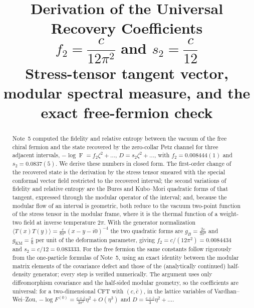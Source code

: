 \documentclass[11pt]{article}
\title{\vspace{-1.55cm}\color{navy}\bfseries
Derivation of the Universal Recovery Coefficients\\[0.35em]
\Large \(f_2=\dfrac{c}{12\pi^2}\) and \(s_2=\dfrac{c}{12}\)\\[0.5em]
\large Stress-tensor tangent vector, modular spectral measure, and the exact free-fermion check}
\author{}
\date{}
\theoremstyle{accent}
\theoremstyle{definition}
\newcommand{\Fid}{\operatorname{F}}
\begin{document}
\maketitle
\vspace{-1.55em}

\begin{abstract}
Note~5 computed the fidelity and relative entropy between the vacuum of the free chiral fermion and the state recovered by the zero-collar Petz channel for three adjacent intervals, \(-\log\Fid=f_2\zeta^2+\dots\), \(D=s_2\zeta^2+\dots\), with \(f_2=0.008444(1)\) and \(s_2=0.0837(5)\).  We derive these numbers in closed form.  The first-order change of the recovered state is the derivation by the stress tensor smeared with the special conformal vector field restricted to the recovered interval; the second variations of fidelity and relative entropy are the Bures and Kubo--Mori quadratic forms of that tangent, expressed through the modular operator of the interval; and, because the modular flow of an interval is geometric, both reduce to the vacuum two-point function of the stress tensor in the modular frame, where it is the thermal function of a weight-two field at inverse temperature \(2\pi\).  With the generator normalization \(\langle T(x)T(y)\rangle=\frac{c}{8\pi^2}(x-y-i0)^{-4}\) the two quadratic forms are \(g_B=\frac{2c}{3\pi^2}\) and \(g_{\mathrm{KM}}=\frac c6\) per unit of the deformation parameter, giving \(f_2=c/(12\pi^2)=0.0084434\) and \(s_2=c/12=0.083333\).  For the free fermion the same constants follow rigorously from the one-particle formulas of Note~5, using an exact identity between the modular matrix elements of the covariance defect and those of the (analytically continued) half-density generator; every step is verified numerically.  The argument uses only diffeomorphism covariance and the half-sided modular geometry, so the coefficients are universal: for a two-dimensional CFT with \((c,\bar c)\), in the lattice variables of Vardhan--Wei--Zou, \(-\log F^{(0)}=\frac{c+\bar c}{3\pi^2}\eta^2+O(\eta^3)\) and \(D=\frac{c+\bar c}{3}\eta^2+\dots\).
\end{abstract}
\end{document}
